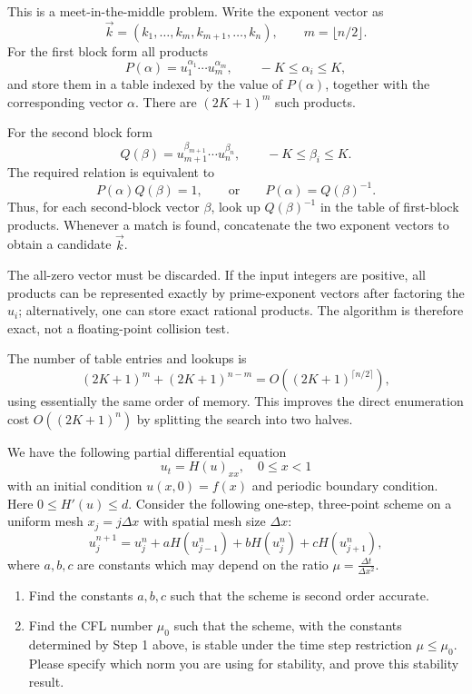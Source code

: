 \begin{solution}
This is a meet-in-the-middle problem.  Write the exponent vector as
\[
\vec{k}=(k_1,\dots,k_m,k_{m+1},\dots,k_n),\qquad m=\lfloor n/2\rfloor .
\]
For the first block form all products
\[
P(\alpha)=u_1^{\alpha_1}\cdots u_m^{\alpha_m},
\qquad -K\leq \alpha_i\leq K,
\]
and store them in a table indexed by the value of $P(\alpha)$, together with the corresponding vector $\alpha$.  There are $(2K+1)^m$ such products.

For the second block form
\[
Q(\beta)=u_{m+1}^{\beta_{m+1}}\cdots u_n^{\beta_n},
\qquad -K\leq \beta_i\leq K.
\]
The required relation is equivalent to
\[
P(\alpha)Q(\beta)=1,\qquad\text{or}\qquad P(\alpha)=Q(\beta)^{-1}.
\]
Thus, for each second-block vector $\beta$, look up $Q(\beta)^{-1}$ in the table of first-block products.  Whenever a match is found, concatenate the two exponent vectors to obtain a candidate $\vec{k}$.

The all-zero vector must be discarded.  If the input integers are positive, all products can be represented exactly by prime-exponent vectors after factoring the $u_i$; alternatively, one can store exact rational products.  The algorithm is therefore exact, not a floating-point collision test.

The number of table entries and lookups is
\[
(2K+1)^m+(2K+1)^{n-m}=O((2K+1)^{\lceil n/2\rceil}),
\]
using essentially the same order of memory.  This improves the direct enumeration cost $O((2K+1)^n)$ by splitting the search into two halves.
\end{solution}

\begin{exercise}
\label{applied:2017:7}
We have the following partial differential equation
\begin{equation}
u_t = H(u)_{xx}, \quad 0 \leq x < 1
\end{equation}
with an initial condition $u(x, 0) = f(x)$ and periodic boundary condition. Here $0 \leq H'(u) \leq d$. Consider the following one-step, three-point scheme on a uniform mesh $x_j = j\Delta x$ with spatial mesh size $\Delta x$:
\begin{equation}
u_j^{n+1} = u_j^n + a H(u_{j-1}^n) + b H(u_j^n) + c H(u_{j+1}^n),
\end{equation}
where $a, b, c$ are constants which may depend on the ratio $\mu = \frac{\Delta t}{\Delta x^2}$.
\begin{enumerate}
    \item Find the constants $a, b, c$ such that the scheme is second order accurate.
    \item Find the CFL number $\mu_0$ such that the scheme, with the constants determined by Step 1 above, is stable under the time step restriction $\mu \leq \mu_0$. Please specify which norm you are using for stability, and prove this stability result.
\end{enumerate}
\end{exercise}

